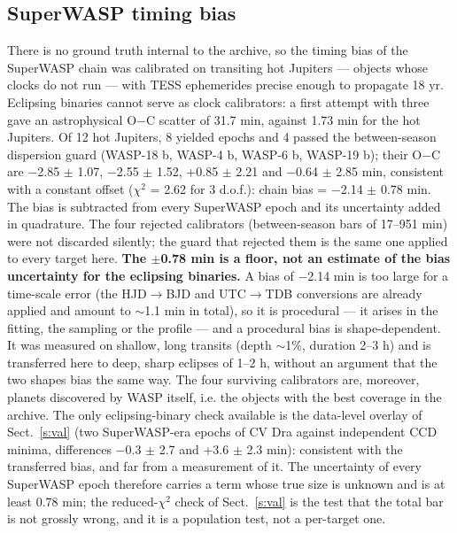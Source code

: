 \documentclass{aa}
\begin{document}
\subsection{SuperWASP timing bias}\label{ss:vies}
There is no ground truth internal to the archive, so the timing bias of the SuperWASP chain was calibrated on transiting hot Jupiters --- objects whose clocks do not run --- with TESS ephemerides precise enough to propagate 18 yr. Eclipsing binaries cannot serve as clock calibrators: a first attempt with three gave an astrophysical O$-$C scatter of 31.7 min, against 1.73 min for the hot Jupiters. Of 12 hot Jupiters, 8 yielded epochs and 4 passed the between-season dispersion guard (WASP-18 b, WASP-4 b, WASP-6 b, WASP-19 b); their O$-$C are $-$2.85 $\pm$ 1.07, $-$2.55 $\pm$ 1.52, +0.85 $\pm$ 2.21 and $-$0.64 $\pm$ 2.85 min, consistent with a constant offset ($\chi^2$ = 2.62 for 3 d.o.f.):
chain bias = $-$2.14 $\pm$ 0.78 min.
The bias is subtracted from every SuperWASP epoch and its uncertainty added in quadrature. The four rejected calibrators (between-season bars of 17--951 min) were not discarded silently; the guard that rejected them is the same one applied to every target here.
\textbf{The $\pm$0.78 min is a floor, not an estimate of the bias uncertainty for the eclipsing binaries.} A bias of $-$2.14 min is too large for a time-scale error (the HJD$\rightarrow$BJD and UTC$\rightarrow$TDB conversions are already applied and amount to $\sim$1.1 min in total), so it is procedural --- it arises in the fitting, the sampling or the profile --- and a procedural bias is shape-dependent. It was measured on shallow, long transits (depth $\sim$1\%, duration 2--3 h) and is transferred here to deep, sharp eclipses of 1--2 h, without an argument that the two shapes bias the same way. The four surviving calibrators are, moreover, planets discovered by WASP itself, i.e. the objects with the best coverage in the archive. The only eclipsing-binary check available is the data-level overlay of Sect.~\ref{s:val} (two SuperWASP-era epochs of CV Dra against independent CCD minima, differences $-$0.3 $\pm$ 2.7 and +3.6 $\pm$ 2.3 min): consistent with the transferred bias, and far from a measurement of it. The uncertainty of every SuperWASP epoch therefore carries a term whose true size is unknown and is at least 0.78 min; the reduced-$\chi^2$ check of Sect.~\ref{s:val} is the test that the total bar is not grossly wrong, and it is a population test, not a per-target one.
\end{document}
